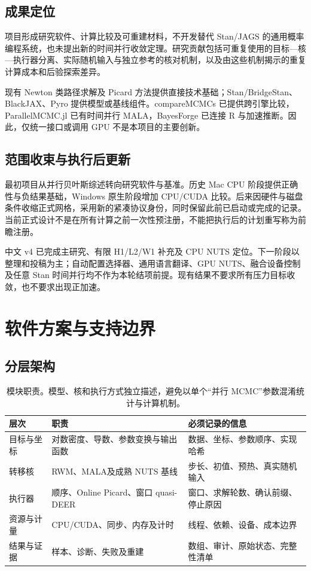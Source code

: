\documentclass[UTF8,zihao=-4,a4paper,fontset=fandol]{ctexart}
\begin{document}
\subsection{成果定位}
项目形成研究软件、计算比较及可重建材料，不开发替代 Stan/JAGS 的通用概率编程系统，也未提出新的时间并行收敛定理。研究贡献包括可重复使用的目标—核—执行器分离、实际随机输入与独立参考的核对机制，以及由这些机制揭示的重复计算成本和后验探索差异。

现有 Newton 类路径求解及 Picard 方法提供直接技术基础\cite{zoltowski,grazzi,gonzalez}；Stan/BridgeStan、BlackJAX、Pyro 提供模型或基线组件\cite{stan,bridgestan,blackjax,pyro}。compareMCMCs 已提供跨引擎比较，ParallelMCMC.jl 已有时间并行 MALA，BayesForge 已连接 R 与加速推断\cite{comparemcmcs,parallelmcmc,bayesforge}。因此，仅统一接口或调用 GPU 不是本项目的主要创新。

\subsection{范围收束与执行后更新}
最初项目从并行贝叶斯综述转向研究软件与基准。历史 Mac CPU 阶段提供正确性与负结果基础，Windows 原生阶段增加 CPU/CUDA 比较。后来因硬件与磁盘条件收缩正式网格，采用新的紧凑协议身份，同时保留此前已启动或完成的记录。当前正式设计不是在所有计算之前一次性预注册，不能把执行后的计划重写称为前瞻注册。

中文 v4 已完成主研究、有限 H1/L2/W1 补充及 CPU NUTS 定位。下一阶段以整理和投稿为主；自动配置选择器、通用语言翻译、GPU NUTS、融合设备控制及任意 Stan 时间并行均不作为本轮结项前提。现有结果不要求所有压力目标收敛，也不要求出现正加速。

\section{软件方案与支持边界}
\subsection{分层架构}
\begin{table}[htbp]\centering\smalltable
\begin{tabularx}{\linewidth}{P{27mm}Y Y}\toprule
层次 & 职责 & 必须记录的信息\\\midrule
目标与坐标 & 对数密度、导数、参数变换与输出函数 & 数据、坐标、参数顺序、实现哈希\\
转移核 & RWM、MALA及成熟 NUTS 基线 & 步长、初值、预热、真实随机输入\\
执行器 & 顺序、Online Picard、窗口 quasi-DEER & 窗口、求解轮数、确认前缀、停止原因\\
资源与计量 & CPU/CUDA、同步、内存及计时 & 线程、依赖、设备、成本边界\\
结果与证据 & 样本、诊断、失败及重建 & 数组、审计、原始状态、完整性清单\\\bottomrule
\end{tabularx}
\caption{模块职责。模型、核和执行方式独立描述，避免以单个“并行 MCMC”参数混淆统计与计算机制。}
\end{table}
\end{document}
